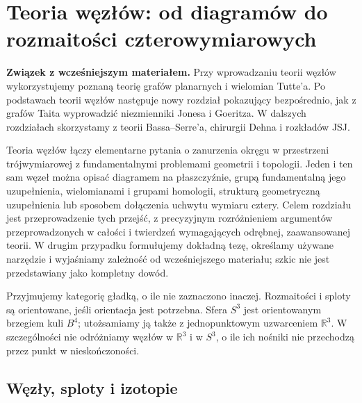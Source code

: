 \documentclass[11pt,a4paper]{report}
\numberwithin{equation}{section}
\theoremstyle{plain}
\theoremstyle{definition}
\theoremstyle{remark}
\begin{document}



\chapter{Teoria węzłów: od diagramów do rozmaitości czterowymiarowych}
\label{ch:teoria-wezlow}

\noindent\textbf{Związek z wcześniejszym materiałem.}
Przy wprowadzaniu teorii węzłów wykorzystujemy poznaną teorię
grafów planarnych i wielomian Tutte'a. Po podstawach teorii
węzłów następuje nowy rozdział pokazujący bezpośrednio, jak
z grafów Taita wyprowadzić niezmienniki Jonesa i Goeritza.
W dalszych rozdziałach skorzystamy z teorii Bassa--Serre'a,
chirurgii Dehna i rozkładów JSJ.


Teoria węzłów łączy elementarne pytania o zanurzenia okręgu w przestrzeni
trójwymiarowej z fundamentalnymi problemami geometrii i topologii.
Jeden i ten sam węzeł można opisać diagramem na płaszczyźnie, grupą
fundamentalną jego uzupełnienia, wielomianami i grupami homologii,
strukturą geometryczną uzupełnienia lub sposobem dołączenia uchwytu
wymiaru cztery. Celem rozdziału jest przeprowadzenie tych przejść,
z precyzyjnym rozróżnieniem argumentów przeprowadzonych w całości
i twierdzeń wymagających odrębnej, zaawansowanej teorii. W drugim
przypadku formułujemy dokładną tezę, określamy używane narzędzie
i wyjaśniamy zależność od wcześniejszego materiału; szkic nie jest
przedstawiany jako kompletny dowód.

Przyjmujemy kategorię gładką, o ile nie zaznaczono inaczej.
Rozmaitości i sploty są orientowane, jeśli orientacja jest potrzebna.
Sfera $S^3$ jest orientowanym brzegiem kuli $B^4$; utożsamiamy ją także
z jednopunktowym uzwarceniem $\mathbb R^3$. W szczególności
nie odróżniamy węzłów w $\mathbb R^3$ i w $S^3$, o ile ich nośniki
nie przechodzą przez punkt w nieskończoności.

\section{Węzły, sploty i izotopie}
\label{sec:kt-podstawy}
\end{document}
